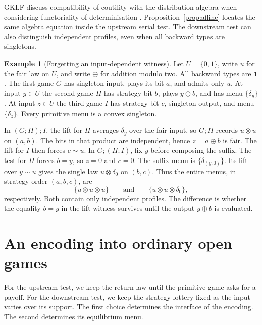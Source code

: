 \documentclass[11pt,a4paper]{article}
\theoremstyle{definition}
\newtheorem{example}[theorem]{Example}
\newcommand{\one}{\mathbf 1}
\begin{document}
GKLF discuss compatibility of coutility with the distribution algebra when considering functoriality of determinisation \cite[discussion following Proposition~20]{gklf}. Proposition~\ref{prop:affine} locates the same algebra equation inside the upstream serial test. The downstream test can also distinguish independent profiles, even when all backward types are singletons.

\begin{example}[Forgetting an input-dependent witness]\label{ex:forget}
    Let $U=\{0,1\}$, write $u$ for the fair law on $U$, and write $\oplus$ for addition modulo two. All backward types are $\one$. The first game $G$ has singleton input, plays its bit $a$, and admits only $u$. At input $y\in U$ the second game $H$ has strategy bit $b$, plays $y\oplus b$, and has menu $\{\delta_y\}$. At input $z\in U$ the third game $I$ has strategy bit $c$, singleton output, and menu $\{\delta_z\}$. Every primitive menu is a convex singleton.

    In $(G;H);I$, the lift for $H$ averages $\delta_y$ over the fair input, so $G;H$ records $u\otimes u$ on $(a,b)$. The bits in that product are independent, hence $z=a\oplus b$ is fair. The lift for $I$ then forces $c\sim u$. In $G;(H;I)$, fix $y$ before composing the suffix. The test for $H$ forces $b=y$, so $z=0$ and $c=0$. The suffix menu is $\{\delta_{(y,0)}\}$. Its lift over $y\sim u$ gives the single law $u\otimes\delta_0$ on $(b,c)$. Thus the entire menus, in strategy order $(a,b,c)$, are
    \[
        \{u\otimes u\otimes u\}
        \qquad\text{and}\qquad
        \{u\otimes u\otimes\delta_0\},
    \]
    respectively. Both contain only independent profiles. The difference is whether the equality $b=y$ in the lift witness survives until the output $y\oplus b$ is evaluated.
\end{example}

\section{An encoding into ordinary open games}\label{sec:encode}

For the upstream test, we keep the return law until the primitive game asks for a payoff. For the downstream test, we keep the strategy lottery fixed as the input varies over its support. The first choice determines the interface of the encoding. The second determines its equilibrium menu.
\end{document}
